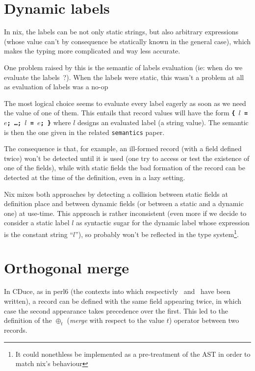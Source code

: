 \documentclass{article}
\newcommand{\Γ}{\Gamma}
\newcommand{\τ}{\tau}
\begin{document}
\section{Dynamic labels}

In nix, the labels can be not only static strings, but also arbitrary
expressions (whose value can't by consequence be statically known in the
general case), which makes the typing more complicated and way less accurate.

One problem raised by this is the semantic of labels evaluation (ie: when do we
evaluate the labels ?). When the labels were static, this wasn't a problem at
all as evaluation of labels was a no-op

The most logical choice seems to evaluate every label eagerly as soon as we
need the value of one of them. This entails that record values will have the
form \texttt{\bfseries \{ $l$ = $e$; \ldots{}; $l$ = $e$; \}} where $l$ designs
an evaluated label (a string value). The semantic is then the one given in the
related \texttt{semantics} paper.

The consequence is that, for example, an ill-formed record (with a field
defined twice) won't be detected until it is used (one try to access or test
the existence of one of the fields), while with static fields the bad formation
of the record can be detected at the time of the definition, even in a lazy
setting.

Nix mixes both approaches by detecting a collision between static fields at
definition place and between dynamic fields (or between a static and a dynamic
one) at use-time. This approach is rather inconsistent (even more if we decide
to consider a static label $l$ as syntactic sugar for the dynamic label whose
expression is the constant string ``$l$''), so probably won't be reflected in
the type system\footnote{It could nonethless be implemented as a pre-treatment
of the AST in order to match nix's behaviour}.

\section{Orthogonal merge}

In CDuce, as in perl6 (the contexts into which respectivly~\cite{Fri04}
and~\cite{Cas15} have been written), a record can be defined with the same field
appearing twice, in which case the second appearance takes precedence over the
first. This led to the definition of the $\oplus_t$ (\emph{merge} with
respect to the value $t$) operator between two records.
\end{document}
